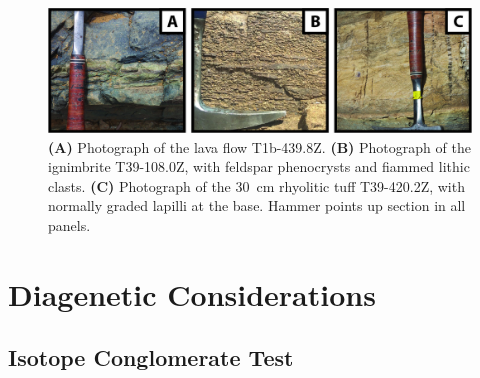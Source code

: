 \begin{figure}[h!]
\begin{center}
	\includegraphics[width=\textwidth]{figures/Tambien/geochronology-photos.jpg}
	\caption{\textbf{(A)} Photograph of the lava flow T1b-439.8Z. \textbf{(B)} Photograph of the ignimbrite T39-108.0Z, with feldspar phenocrysts and fiammed lithic clasts. \textbf{(C)} Photograph of the 30~cm rhyolitic tuff T39-420.2Z, with normally graded lapilli at the base. Hammer points up section in all panels.}
	\label{fig:geochronology-photos}
\end{center}
\end{figure}

\clearpage

\section{Diagenetic Considerations}

\subsection{Isotope Conglomerate Test}

